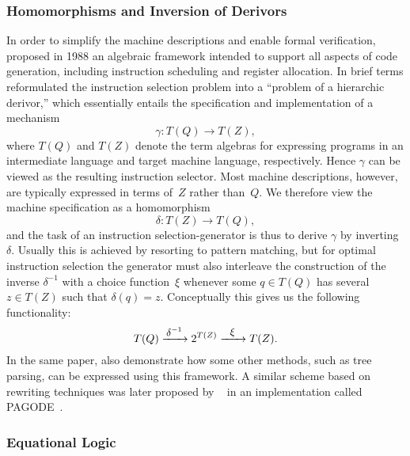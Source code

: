 {\subsubsection{Homomorphisms and Inversion of Derivors}

In order to simplify the \glspl{machine description} and enable formal
verification, \textcite{Geigerich1988} proposed in 1988 an algebraic framework
intended to support all aspects of \gls{code generation}, including
\gls{instruction scheduling} and \gls{register allocation}.
%
In brief terms
\citeauthor{Geigerich1988} reformulated the \gls{instruction selection} problem
into a ``problem of a hierarchic derivor,'' which essentially entails the
specification and implementation of a mechanism
\begin{displaymath}
  \gamma: T(Q) \rightarrow T(Z),
\end{displaymath}
where $T(Q)$ and $T(Z)$ denote the term algebras for expressing \glspl{program}
in an intermediate language and \gls{target machine} language,
respectively.
%
Hence $\gamma$ can be viewed as the resulting \gls{instruction
  selector}.
%
Most \glspl{machine description}, however, are typically expressed
in terms of~$Z$ rather than~$Q$.
%
 We therefore view the machine specification as
a \gls{homomorphism}
\begin{displaymath}
  \delta: T(Z) \rightarrow T(Q),
\end{displaymath}
and the task of an \gls{instruction selection}-generator is thus to derive
$\gamma$ by inverting~$\delta$.
%
Usually this is achieved by resorting to
\gls{pattern matching}, but for optimal \gls{instruction
  selection} the generator must also interleave the construction of the inverse
$\delta^{-1}$ with a \gls{choice function}~$\xi$ whenever some \mbox{$q \in
  T(Q)$} has several \mbox{$z \in T(Z)$} such that \mbox{$\delta(q) =
  z$}.
%
Conceptually this gives us the following functionality:
\begin{displaymath}
  \def\annotArrow#1{\xrightarrow{\makebox[6mm]{\small$#1$}}}
  T(Q) \annotArrow{\delta^{-1}} 2^{T(Z)} \annotArrow{\xi} T(Z).
\end{displaymath}
In the same paper, \citeauthor{Geigerich1988} also demonstrate how some other
methods, such as \gls{tree parsing}, can be expressed using this framework.
%
A
similar scheme based on rewriting techniques was later proposed by
\citeauthor{Despland1990}~\cite{Despland1987, Despland1990} in an implementation
called \gls{PAGODE}~\cite{Canalda1995}.


\subsubsection{Equational Logic}

}
